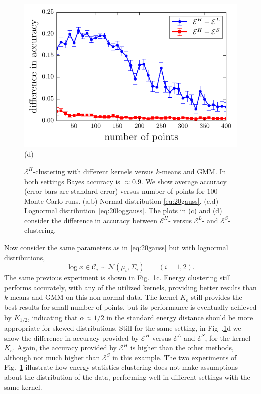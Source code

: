 \documentclass[aps,preprint,nofootinbib,floatfix]{revtex4-1}
\newcommand\kk{K}
\newcommand\C{{\mathcal{C}}}
\begin{document}
\begin{figure}
\begin{minipage}{0.49\textwidth}
\end{minipage}
\begin{minipage}{0.49\textwidth}
\centering
\includegraphics[width=1\textwidth]{lognormal_kernels_difference.pdf}\\[-1.0em]
(d)
\end{minipage}
\caption{
\label{fig:consist}
$\mathcal{E}^H$-clustering with different kernels versus
$k$-means and GMM. In both settings Bayes accuracy
is $\approx 0.9$. We show average accuracy (error bars are standard error)
versus number of points for $100$ Monte Carlo runs.
(a,b) Normal distribution \eqref{eq:20gauss}. 
(c,d) Lognormal distribution~\eqref{eq:20loggauss}.
The plots in (c) and (d) consider the difference in accuracy
between $\mathcal{E}^H$- versus $\mathcal{E}^L$- and
$\mathcal{E}^S$-clustering.
}
\end{figure}

Now consider the same parameters as in \eqref{eq:20gauss} but with
lognormal distributions, 
\begin{equation}
\label{eq:20loggauss}
\log x \in \C_i \sim \mathcal{N}(\mu_i, \Sigma_i) \qquad (i=1,2).
\end{equation}
The same previous experiment is shown in 
Fig.~\ref{fig:consist}c.
Energy clustering still performs accurately, with any of the utilized
kernels, providing better results than $k$-means and GMM on
this non-normal data. The kernel $\kk_e$ still provides the best results
for small number of points, but its performance is eventually achieved by
$\kk_{1/2}$, indicating that $\alpha \approx 1/2$ in the standard
energy distance should be more appropriate for skewed distributions.
Still for the same setting, in Fig~.\ref{fig:consist}d
we show the difference in accuracy provided by $\mathcal{E}^H$ versus
$\mathcal{E}^L$ and $\mathcal{E}^S$, for the kernel $\kk_e$. Again,
the accuracy provided by $\mathcal{E}^H$ is higher than the other methods,
although not much higher than $\mathcal{E}^S$ in this example.
The two experiments of Fig.~\ref{fig:consist}
illustrate how energy statistics clustering does not make assumptions
about the distribution of the data, performing well in different settings
with the same kernel. 
\end{document}
